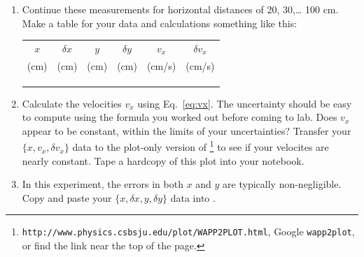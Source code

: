 \begin{enumerate}
\item  Continue these measurements for horizontal distances of 20, 30,\ldots
100 cm.  Make a table for your data and calculations something like this:

\begin{center}
\begin{tabular}{|c|c|c|c|c|c|}
\hline
$x$ & $\delta x$& $y$ & $\delta y$& $v_{x}$ & $\delta v_{x}$ \\
 (cm) & (cm)   &  (cm)& (cm)      & (cm/s) &  (cm/s)\\
\hline
 \phantom{10000}& \phantom{10000}   &  \phantom{10000}& \phantom{10000}      & \phantom{10000} &  \phantom{10000} \\
\hline
  &   &  &  &  &      \\ \hline
  &   &  &  &  &      \\ \hline
\end{tabular}
\end{center}
\item Calculate the velocities $v_{x}$ using Eq.~\ref{eq:vx}.  The uncertainty
should be easy to compute using the formula you worked out before coming to
lab.  Does $v_{x}$ appear to be constant, within the limits of your uncertainties?
Transfer your $\{x,v_x,\delta v_x\}$ data to the plot-only version of \WAPP\footnote{
{\tt http://www.physics.csbsju.edu/plot/WAPP2PLOT.html}, Google {\tt wapp2plot}, or find the
link near the top of the \WAPP page.} to see if your velocites are nearly constant.  
Tape a hardcopy of this plot into your notebook.


\item  In this experiment, the errors in both $x$ and $y$ are
typically non-negligible.  Copy and paste  your $\{x,\delta x,y,\delta y\}$ data
into \WAPP.



\end{enumerate}
